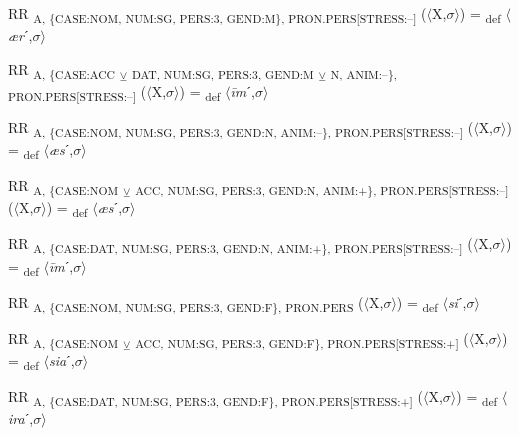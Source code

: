 {\begin{exe}
 RR \textsubscript{A, \{CASE:NOM, NUM:SG, PERS:3, GEND:M\}, PRON.PERS[STRESS:–]} ($\langle$X,$\sigma $$\rangle$) = \textsubscript{def} $\langle$\textit{ær}ˊ,$\sigma $$\rangle$
\end{exe}

\begin{exe}
 RR \textsubscript{A, \{CASE:ACC} \textsubscript{${\veebar}$}\textsubscript{ DAT, NUM:SG, PERS:3, GEND:M} \textsubscript{${\veebar}$}\textsubscript{ N, ANIM:–\}, PRON.PERS[STRESS:–]} ($\langle$X,$\sigma $$\rangle$) = \textsubscript{def} $\langle$\textit{\=im}ˊ,$\sigma $$\rangle$
\end{exe}

\begin{exe}
 RR \textsubscript{A, \{CASE:NOM, NUM:SG, PERS:3, GEND:N, ANIM:–\}, PRON.PERS[STRESS:–]} ($\langle$X,$\sigma $$\rangle$) = \textsubscript{def} $\langle$\textit{æs}ˊ,$\sigma $$\rangle$
\end{exe}

\begin{exe}
 RR \textsubscript{A, \{CASE:NOM} \textsubscript{${\veebar}$}\textsubscript{ ACC, NUM:SG, PERS:3, GEND:N, ANIM:+\}, PRON.PERS[STRESS:–]} ($\langle$X,$\sigma $$\rangle$) = \textsubscript{def} $\langle$\textit{æs}ˊ,$\sigma $$\rangle$
\end{exe}

\begin{exe}
 RR \textsubscript{A, \{CASE:DAT, NUM:SG, PERS:3, GEND:N, ANIM:+\}, PRON.PERS[STRESS:–]} ($\langle$X,$\sigma $$\rangle$) = \textsubscript{def} $\langle$\textit{\=im}ˊ,$\sigma $$\rangle$
\end{exe}

\begin{exe}
 RR \textsubscript{A, \{CASE:NOM, NUM:SG, PERS:3, GEND:F\}, PRON.PERS} ($\langle$X,$\sigma $$\rangle$) = \textsubscript{def} $\langle$\textit{si}ˊ,$\sigma $$\rangle$
\end{exe}

\begin{exe}
 RR \textsubscript{A, \{CASE:NOM} \textsubscript{${\veebar}$}\textsubscript{ ACC, NUM:SG, PERS:3, GEND:F\}, PRON.PERS[STRESS:+]} ($\langle$X,$\sigma $$\rangle$) = \textsubscript{def} $\langle$\textit{sia}ˊ,$\sigma $$\rangle$
\end{exe}

\begin{exe}
 RR \textsubscript{A, \{CASE:DAT, NUM:SG, PERS:3, GEND:F\}, PRON.PERS[STRESS:+]} ($\langle$X,$\sigma $$\rangle$) = \textsubscript{def} $\langle$\textit{ira}ˊ,$\sigma $$\rangle$
\end{exe}

}
